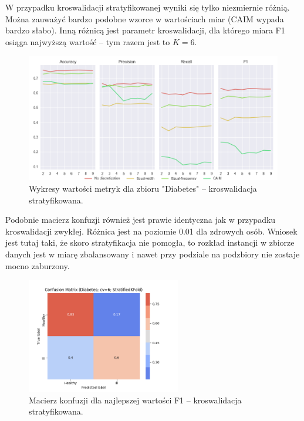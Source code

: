 \pagebreak
W przypadku kroswalidacji stratyfikowanej wyniki się tylko niezmiernie różnią. Można
zauważyć bardzo podobne wzorce w wartościach miar (CAIM wypada bardzo słabo). Inną różnicą
jest parametr kroswalidacji, dla którego miara F1 osiąga najwyższą wartość -- tym razem
jest to $K = 6$.
\begin{figure}[H]
\center
    \includegraphics[width=\textwidth]{img/cv_scores_stratifiedkfold/scoring_stratifiedkfold_diabetes.png}
    \caption{Wykresy wartości metryk dla zbioru "Diabetes" -- kroswalidacja stratyfikowana.}
\end{figure}

Podobnie macierz konfuzji również jest prawie identyczna jak w przypadku kroswalidacji zwykłej.
Różnica jest na poziomie 0.01 dla zdrowych osób. Wniosek jest tutaj taki, że skoro stratyfikacja
nie pomogła, to rozkład instancji w zbiorze danych jest w miarę zbalansowany i nawet przy podziale
na podzbiory nie zostaje mocno zaburzony.

\begin{figure}[H]
\center
    \includegraphics[width=0.6\textwidth]{img/conf_matrices/cm_Diabetes_cv6_StratifiedKFold.png}
    \caption{Macierz konfuzji dla najlepszej wartości F1 -- kroswalidacja stratyfikowana.}
\end{figure}

